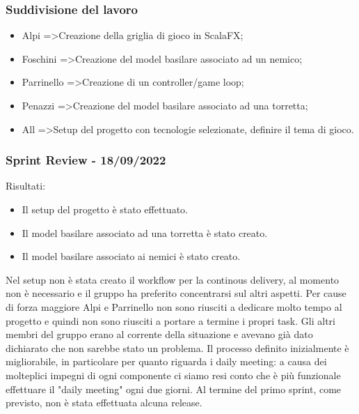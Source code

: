 \subsubsection{Suddivisione del lavoro}
\begin{itemize}
  \item Alpi =\textgreater  Creazione della griglia di gioco in ScalaFX;
  \item Foschini =\textgreater  Creazione del model basilare associato ad un nemico;
  \item Parrinello =\textgreater  Creazione di un controller/game loop;
  \item Penazzi =\textgreater  Creazione del model basilare associato ad una torretta;
  \item All =\textgreater  Setup del progetto con tecnologie selezionate, definire il tema di gioco.
\end{itemize}

\subsubsection{Sprint Review - 18/09/2022}
Risultati:
\begin{itemize}
  \item Il setup del progetto è stato effettuato.
  \item Il model basilare associato ad una torretta è stato creato.
  \item Il model basilare associato ai nemici è stato creato.
\end{itemize}

Nel setup non è stata creato il workflow per la continous delivery, al momento non è necessario e il gruppo ha preferito concentrarsi sul altri aspetti.
Per cause di forza maggiore Alpi e Parrinello non sono riusciti a dedicare molto tempo al progetto e quindi non sono riusciti a portare a termine i propri task. Gli altri membri del gruppo erano al corrente della situazione e avevano già dato dichiarato che non sarebbe stato un problema.
Il processo definito inizialmente è migliorabile, in particolare per quanto riguarda i daily meeting: a causa dei molteplici impegni di ogni componente ci siamo resi conto che è più funzionale effettuare il "daily meeting" ogni due giorni.
Al termine del primo sprint, come previsto, non è stata effettuata alcuna release.
